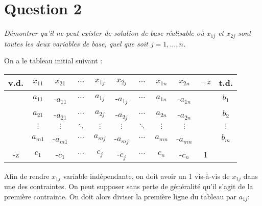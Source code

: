 \section*{Question 2}
\setcounter{subsection}{0}

\emph{Démontrer qu’il ne peut exister de solution de base réalisable où $x_{1j}$ et $x_{2j}$ sont toutes les deux variables de base, quel que soit $j = 1, \dots, n$.}

On a le tableau initial suivant :

\begin{center}
	\renewcommand{\arraystretch}{1.5}
	\begin{tabular}{|c| ccccccccc|c|}
		\hline
		v.d. & $x_{11}$ & $x_{21}$  & $\cdots$ & $x_{1j}$ & $x_{2j}$  & $\cdots$ & $x_{1n}$ & $x_{2n}$  & $-z$ &   t.d.   \\ \hline
		     & $a_{11}$ & -$a_{11}$ & $\cdots$ & $a_{1j}$ & -$a_{1j}$ & $\cdots$ & $a_{1n}$ & -$a_{1n}$ &      &  $b_1$   \\
		     & $a_{21}$ & -$a_{21}$ & $\cdots$ & $a_{2j}$ & -$a_{2j}$ & $\cdots$ & $a_{2n}$ & -$a_{2n}$ &      &  $b_2$   \\
		     & $\vdots$ & $\vdots$  & $\ddots$ & $\vdots$ & $\vdots$  & $\ddots$ & $\vdots$ & $\vdots$  &      & $\vdots$ \\
		     & $a_{m1}$ & -$a_{m1}$ & $\cdots$ & $a_{mj}$ & -$a_{mj}$ & $\cdots$ & $a_{mn}$ & -$a_{mn}$ &      &  $b_m$   \\ \hline
		 -z  & $c_{1}$  & -$c_{1}$  & $\cdots$ & $c_{j}$  & -$c_{j}$  & $\cdots$ & $c_{n}$  & -$c_{n}$  &  1   &          \\ \hline
	\end{tabular}
\end{center}

Afin de rendre $x_{1j}$ variable indépendante, on doit avoir un 1 vis-à-vis de $x_{1j}$ dans une des contraintes. On peut supposer sans perte de généralité qu’il s’agit de la première contrainte. On doit alors diviser la première ligne du tableau par $a_{1j}$:

